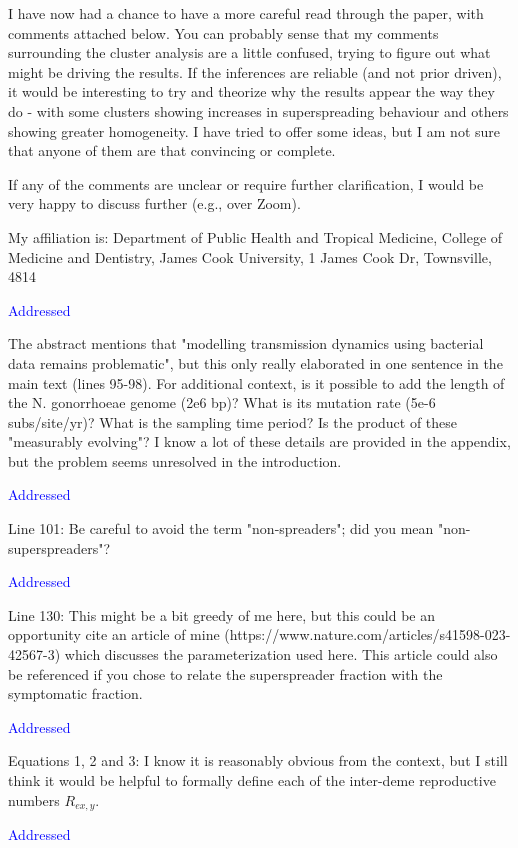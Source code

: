 \documentclass[pdflatex,sn-nature]{sn-jnl}%
\begin{document}
I have now had a chance to have a more careful read through the paper, with comments attached below. You can probably sense that my comments surrounding the cluster analysis are a little confused, trying to figure out what might be driving the results. If the inferences are reliable (and not prior driven), it would be interesting to try and theorize why the results appear the way they do - with some clusters showing increases in superspreading behaviour and others showing greater homogeneity. I have tried to offer some ideas, but I am not sure that anyone of them are that convincing or complete.

If any of the comments are unclear or require further clarification, I would be very happy to discuss further (e.g., over Zoom).

My affiliation is: Department of Public Health and Tropical Medicine, College of Medicine and Dentistry, James Cook University, 1 James Cook Dr, Townsville, 4814

\textcolor{blue}{Addressed}

The abstract mentions that "modelling transmission dynamics using bacterial data remains problematic", but this only really elaborated in one sentence in the main text (lines 95-98). For additional context, is it possible to add the length of the N. gonorrhoeae genome (2e6 bp)? What is its mutation rate (5e-6 subs/site/yr)? What is the sampling time period? Is the product of these "measurably evolving"? I know a lot of these details are provided in the appendix, but the problem seems unresolved in the introduction.

\textcolor{blue}{Addressed}

Line 101: Be careful to avoid the term "non-spreaders"; did you mean "non-superspreaders"?

\textcolor{blue}{Addressed}

Line 130: This might be a bit greedy of me here, but this could be an opportunity cite an article of mine (https://www.nature.com/articles/s41598-023-42567-3) which discusses the parameterization used here. This article could also be referenced if you chose to relate the superspreader fraction with the symptomatic fraction.

\textcolor{blue}{Addressed}


Equations 1, 2 and 3: I know it is reasonably obvious from the context, but I still think it would be helpful to formally define each of the inter-deme reproductive numbers $R_{e x, y}$.

\textcolor{blue}{Addressed}
\end{document}
